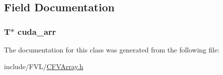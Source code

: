 \subsection{Field Documentation}
\hypertarget{classFVL_1_1CFVArray_ac7c2eda2752dff79215dfcc062d0d814}{
\subsubsection[{cuda\_\-arr}]{\setlength{\rightskip}{0pt plus 5cm}T$\ast$ {\bf cuda\_\-arr}}}
\label{dc/d80/classFVL_1_1CFVArray_ac7c2eda2752dff79215dfcc062d0d814}


The documentation for this class was generated from the following file:\begin{DoxyCompactItemize}
\item 
include/FVL/\hyperlink{CFVArray_8h}{CFVArray.h}\end{DoxyCompactItemize}
